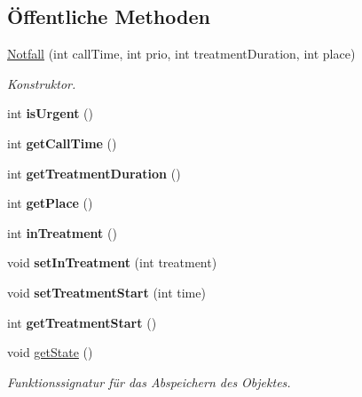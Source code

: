 \subsection*{Öffentliche Methoden}
\begin{DoxyCompactItemize}
\item 
\hyperlink{classNotfall_a7542c732e9bf644347982d4318b00f6e}{Notfall} (int call\+Time, int prio, int treatment\+Duration, int place)
\begin{DoxyCompactList}\small\item\em Konstruktor. \end{DoxyCompactList}\item 
int {\bfseries is\+Urgent} ()\hypertarget{classNotfall_aaa4a4ffbf29b6a9bde87e89c5e182171}{}\label{classNotfall_aaa4a4ffbf29b6a9bde87e89c5e182171}

\item 
int {\bfseries get\+Call\+Time} ()\hypertarget{classNotfall_a020b9affed3c31a2de1ca25e186c14f6}{}\label{classNotfall_a020b9affed3c31a2de1ca25e186c14f6}

\item 
int {\bfseries get\+Treatment\+Duration} ()\hypertarget{classNotfall_ac7fc1ecdc2f4f5a599c48f1fc459ff33}{}\label{classNotfall_ac7fc1ecdc2f4f5a599c48f1fc459ff33}

\item 
int {\bfseries get\+Place} ()\hypertarget{classNotfall_a771c31393b277fc9d6ff72795fd9369d}{}\label{classNotfall_a771c31393b277fc9d6ff72795fd9369d}

\item 
int {\bfseries in\+Treatment} ()\hypertarget{classNotfall_a553f97bedfa3c4ee385f865c306d2d98}{}\label{classNotfall_a553f97bedfa3c4ee385f865c306d2d98}

\item 
void {\bfseries set\+In\+Treatment} (int treatment)\hypertarget{classNotfall_ab9f8cd0089124d156d15030aa30cbb38}{}\label{classNotfall_ab9f8cd0089124d156d15030aa30cbb38}

\item 
void {\bfseries set\+Treatment\+Start} (int time)\hypertarget{classNotfall_ad8eeeb3eb037795140391c33c0e7cc66}{}\label{classNotfall_ad8eeeb3eb037795140391c33c0e7cc66}

\item 
int {\bfseries get\+Treatment\+Start} ()\hypertarget{classNotfall_aa23eafb981e0333cba95f059578e3522}{}\label{classNotfall_aa23eafb981e0333cba95f059578e3522}

\item 
void \hyperlink{classNotfall_a3c65c33128d0c504f22bbefa301a0c95}{get\+State} ()
\begin{DoxyCompactList}\small\item\em Funktionssignatur für das Abspeichern des Objektes. \end{DoxyCompactList}\end{DoxyCompactItemize}



